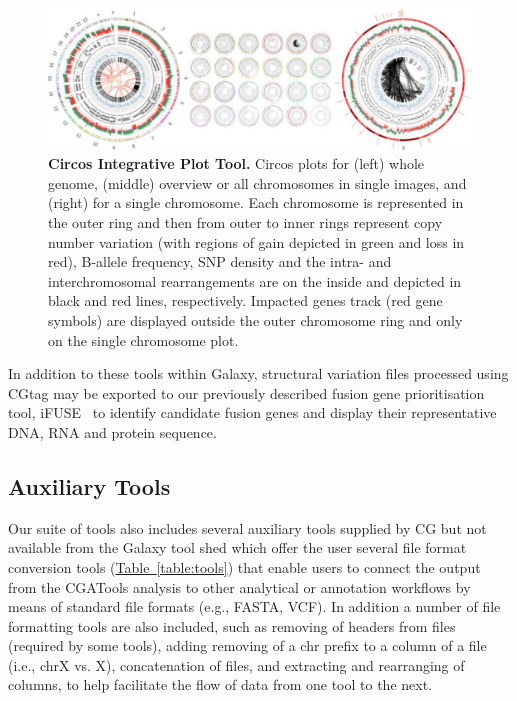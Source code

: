\begin{figure}[t!]
\centering
\includegraphics[scale=1.5]{chapters/images/cgtag/fig2-circos.png}
\caption{\textbf{Circos Integrative Plot Tool.} Circos plots for (left) whole genome, (middle) overview or all chromosomes in single images, and (right) for a single chromosome.  Each chromosome is represented in the outer ring and then from outer to inner rings represent copy number variation (with regions of gain depicted in green and loss in red), B-allele frequency, SNP density and the intra- and interchromosomal rearrangements are on the inside and depicted in black and red lines, respectively.  Impacted genes track (red gene symbols) are displayed outside the outer chromosome ring and only on the single chromosome plot.}\label{fig:circos}
\end{figure}


In addition to these tools within Galaxy, structural variation files processed using CGtag may be exported to our previously described fusion gene prioritisation tool, iFUSE~\cite{url-ifuse} to identify candidate fusion genes and display their representative DNA, RNA and protein sequence.


\subsection*{Auxiliary Tools}

Our suite of tools also includes several auxiliary tools supplied by CG but not available from the Galaxy tool shed which offer the user several file format conversion tools (\hyperref[table:tools]{Table~\ref{table:tools}}) that enable users to connect the output from the CGATools analysis to other analytical or annotation workflows by means of standard file formats (e.g., FASTA, VCF). In addition a number of file formatting tools are also included, such as removing of headers from files (required by some tools), adding removing of a chr prefix to a column of a file (i.e., chrX vs. X), concatenation of files, and extracting and rearranging of columns, to help facilitate the flow of data from one tool to the next.

